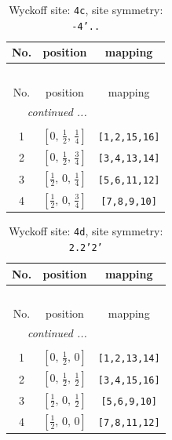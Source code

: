 \documentclass[fleqn,8pt]{jsarticle}
\begin{document}
\renewcommand{\arraystretch}{1.2}
\begin{longtable}{ccc}
\caption{Wyckoff site: {\tt 4c}, site symmetry: {\tt -4'..}}
 \\
 \hline \hline
No. & position & mapping \\ \hline \endfirsthead

\multicolumn{2}{l}{\tablename\ \thetable{}} \\
 \hline \hline
No. & position & mapping \\ \hline \endhead

 \hline \hline
\multicolumn{2}{r}{\footnotesize\it continued ...} \\ \endfoot

 \hline \hline
\multicolumn{2}{r}{} \\ \endlastfoot

1 & $\left[ 0,\, \frac{1}{2},\, \frac{1}{4} \right]$ & {\tt [1,2,15,16]} \\ \hline
2 & $\left[ 0,\, \frac{1}{2},\, \frac{3}{4} \right]$ & {\tt [3,4,13,14]} \\ \hline
3 & $\left[ \frac{1}{2},\, 0,\, \frac{1}{4} \right]$ & {\tt [5,6,11,12]} \\ \hline
4 & $\left[ \frac{1}{2},\, 0,\, \frac{3}{4} \right]$ & {\tt [7,8,9,10]} \\
\end{longtable}
\renewcommand{\arraystretch}{1.2}
\begin{longtable}{ccc}
\caption{Wyckoff site: {\tt 4d}, site symmetry: {\tt 2.2'2'}}
 \\
 \hline \hline
No. & position & mapping \\ \hline \endfirsthead

\multicolumn{2}{l}{\tablename\ \thetable{}} \\
 \hline \hline
No. & position & mapping \\ \hline \endhead

 \hline \hline
\multicolumn{2}{r}{\footnotesize\it continued ...} \\ \endfoot

 \hline \hline
\multicolumn{2}{r}{} \\ \endlastfoot

1 & $\left[ 0,\, \frac{1}{2},\, 0 \right]$ & {\tt [1,2,13,14]} \\ \hline
2 & $\left[ 0,\, \frac{1}{2},\, \frac{1}{2} \right]$ & {\tt [3,4,15,16]} \\ \hline
3 & $\left[ \frac{1}{2},\, 0,\, \frac{1}{2} \right]$ & {\tt [5,6,9,10]} \\ \hline
4 & $\left[ \frac{1}{2},\, 0,\, 0 \right]$ & {\tt [7,8,11,12]} \\
\end{longtable}
\end{document}
